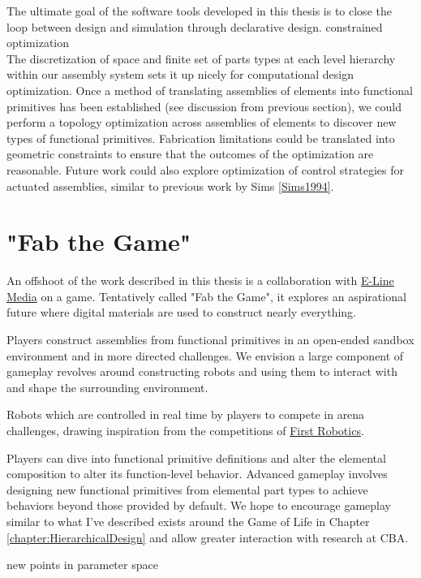 {The ultimate goal of the software tools developed in this thesis is to close the loop between design and simulation through declarative design.  constrained optimization\\

 The discretization of space and finite set of parts types at each level hierarchy within our assembly system sets it up nicely for computational design optimization.  Once a method of translating assemblies of elements into functional primitives has been established (see discussion from previous section), we could perform a topology optimization across assemblies of elements to discover new types of functional primitives.  Fabrication limitations could be translated into geometric constraints to ensure that the outcomes of the optimization are reasonable.  Future work could also explore optimization of control strategies for actuated assemblies, similar to previous work by Sims \ref{Sims1994}.


\section{"Fab the Game"}

An offshoot of the work described in this thesis is a collaboration with \href{http://elinemedia.com/}{E-Line Media} on a game.  Tentatively called "Fab the Game", it explores an aspirational future where digital materials are used to construct nearly everything.  

Players construct assemblies from functional primitives in an open-ended sandbox environment and in more directed challenges.  We envision a large component of gameplay revolves around constructing robots and using them to interact with and shape the surrounding environment.


Robots which are controlled in real time by players to compete in arena challenges, drawing inspiration from the competitions of \href{http://www.firstinspires.org/robotics/frc}{First Robotics}.


Players can dive into functional primitive definitions and alter the elemental composition to alter its function-level behavior.  Advanced gameplay involves designing new functional primitives from elemental part types to achieve behaviors beyond those provided by default.  We hope to encourage gameplay similar to what I've described exists around the Game of Life in Chapter \ref{chapter:HierarchicalDesign} and allow greater interaction with research at CBA.

new points in parameter space

}

